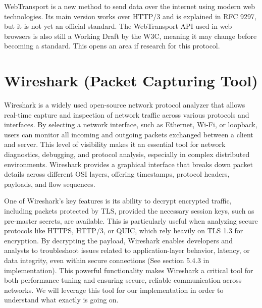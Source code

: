 WebTransport is a new method to send data over the internet using modern web technologies. Its main version works over HTTP/3 and is explained in RFC 9297, but it is not yet an official standard. The WebTransport API used in web browsers is also still a Working Draft by the W3C, meaning it may change before becoming a standard. This opens an area if research for this protocol.
\section{Wireshark (Packet Capturing Tool)}

Wireshark is a widely used open-source network protocol analyzer that allows real-time capture and inspection of network traffic across various protocols and interfaces. By selecting a network interface, such as Ethernet, Wi-Fi, or loopback, users can monitor all incoming and outgoing packets exchanged between a client and server. This level of visibility makes it an essential tool for network diagnostics, debugging, and protocol analysis, especially in complex distributed environments. Wireshark provides a graphical interface that breaks down packet details across different OSI layers, offering timestamps, protocol headers, payloads, and flow sequences.

One of Wireshark’s key features is its ability to decrypt encrypted traffic, including packets protected by TLS, provided the necessary session keys, such as pre-master secrets, are available. This is particularly useful when analyzing secure protocols like HTTPS, HTTP/3, or QUIC, which rely heavily on TLS 1.3 for encryption. By decrypting the payload, Wireshark enables developers and analysts to troubleshoot issues related to application-layer behavior, latency, or data integrity, even within secure connections (See  section 5.4.3 in implementation). This powerful functionality makes Wireshark a critical tool for both performance tuning and ensuring secure, reliable communication across networks. We will leverage this tool for our implementation in order to understand what exactly is going on.


